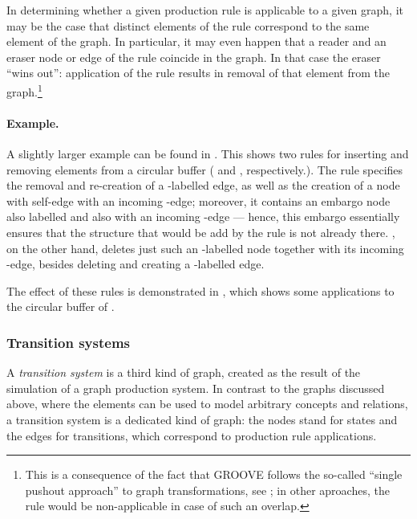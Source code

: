 In determining whether a given production rule is applicable to a given graph,
it may be the case that distinct elements of the rule correspond to the same
element of the graph. In particular, it may even happen that a reader and an
eraser node or edge of the rule coincide in the graph. In that case the eraser
``wins out'': application of the rule results in removal of that element from
the graph.\footnote{This is a consequence of the fact that GROOVE follows the
  so-called ``single pushout approach'' to graph transformations, see
  \cite{Loewe1993}; in other aproaches, the rule would be non-applicable in case
  of such an overlap.}

\paragraph{Example.}

A slightly larger example can be found in . This shows
two rules for inserting and removing elements from a circular buffer (\Put{}
and \Get, respectively.). The \Put{} rule specifies the removal and re-creation
of a \snip{\Last}-labelled edge, as well as the creation of a node with
self-edge \Object{} with an incoming \Val-edge; moreover, it contains an embargo
node also labelled \Object{} and also with an incoming \Val-edge --- hence,
this embargo essentially ensures that the structure that would be add by the
rule is not already there. \Get, on the other hand, deletes just such an
\Object-labelled node together with its incoming \Val-edge, besides deleting and
creating a \First-labelled edge.
%

The effect of these rules is demonstrated in , which
shows some applications to the circular buffer of .
%

\subsubsection{Transition systems}

A \emph{transition system} is a third kind of graph, created as the result of
the simulation of a graph production system. In contrast to the graphs
discussed above, where the elements can be used to model arbitrary concepts and
relations, a transition system is a dedicated kind of graph: the nodes stand
for states and the edges for transitions, which correspond to production rule
applications.

